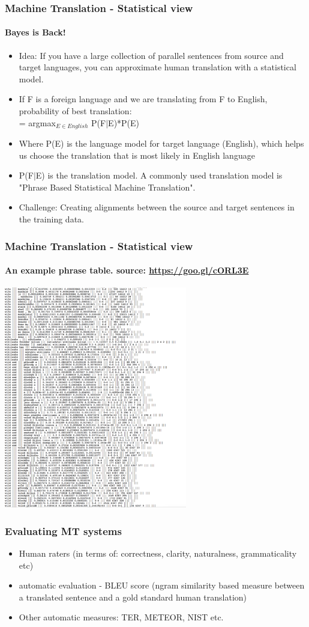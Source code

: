 \documentclass{beamer}
\begin{document}
\begin{frame}
\frametitle{Machine Translation - Statistical view}
\framesubtitle{Bayes is Back!}
\begin{itemize}
\item Idea: If you have a large collection of parallel sentences from source and target languages, you can approximate human translation with a statistical model.
\item If F is a foreign language and we are translating from F to English, probability of best translation:
\\ = argmax$_{E \in English }$ P(F$|$E)*P(E)
\item Where P(E) is the language model for target language (English), which helps us choose the translation that is most likely in English language
\item P(F$|$E) is the translation model. A commonly used translation model is "Phrase Based Statistical Machine Translation".
\item Challenge: Creating alignments between the source and target sentences in the training data. 
\end{itemize}
\end{frame} %

\begin{frame}
\frametitle{Machine Translation - Statistical view}
\framesubtitle{An example phrase table. source: \url{https://goo.gl/cORL3E}}
\includegraphics[width=0.6\textwidth]{PhraseTable.png}
\end{frame} %

\begin{frame}
\frametitle{Evaluating MT systems}
\begin{itemize}
\item Human raters (in terms of: correctness, clarity, naturalness, grammaticality etc)
\item automatic evaluation - BLEU score (ngram similarity based measure between a translated sentence and a gold standard human translation)
\item Other automatic measures: TER, METEOR, NIST etc. 
\end{itemize}
\end{frame} %
\end{document}
